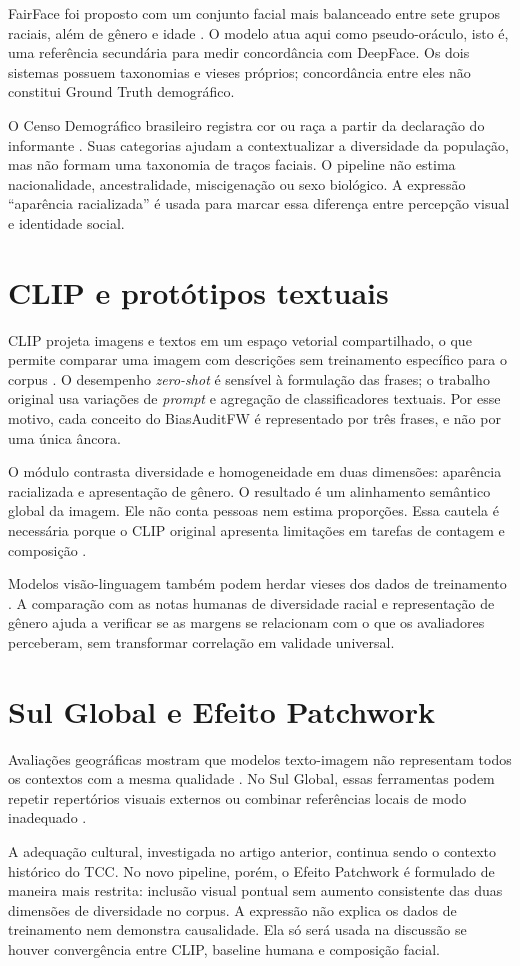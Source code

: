 FairFace foi proposto com um conjunto facial mais balanceado entre sete grupos raciais, além de gênero e idade \cite{karkkainen2021fairface}. O modelo atua aqui como pseudo-oráculo, isto é, uma referência secundária para medir concordância com DeepFace. Os dois sistemas possuem taxonomias e vieses próprios; concordância entre eles não constitui Ground Truth demográfico.

O Censo Demográfico brasileiro registra cor ou raça a partir da declaração do informante \cite{ibge2023corraca}. Suas categorias ajudam a contextualizar a diversidade da população, mas não formam uma taxonomia de traços faciais. O pipeline não estima nacionalidade, ancestralidade, miscigenação ou sexo biológico. A expressão ``aparência racializada'' é usada para marcar essa diferença entre percepção visual e identidade social.

\section{CLIP e protótipos textuais}

CLIP projeta imagens e textos em um espaço vetorial compartilhado, o que permite comparar uma imagem com descrições sem treinamento específico para o corpus \cite{radford2021}. O desempenho \textit{zero-shot} é sensível à formulação das frases; o trabalho original usa variações de \textit{prompt} e agregação de classificadores textuais. Por esse motivo, cada conceito do BiasAuditFW é representado por três frases, e não por uma única âncora.

O módulo contrasta diversidade e homogeneidade em duas dimensões: aparência racializada e apresentação de gênero. O resultado é um alinhamento semântico global da imagem. Ele não conta pessoas nem estima proporções. Essa cautela é necessária porque o CLIP original apresenta limitações em tarefas de contagem e composição \cite{paiss2023counting}.

Modelos visão-linguagem também podem herdar vieses dos dados de treinamento \cite{alsahili2025}. A comparação com as notas humanas de diversidade racial e representação de gênero ajuda a verificar se as margens se relacionam com o que os avaliadores perceberam, sem transformar correlação em validade universal.

\section{Sul Global e Efeito Patchwork}

Avaliações geográficas mostram que modelos texto-imagem não representam todos os contextos com a mesma qualidade \cite{hall2024}. No Sul Global, essas ferramentas podem repetir repertórios visuais externos ou combinar referências locais de modo inadequado \cite{mim2024, rege2025, zhang2024cultural}.

A adequação cultural, investigada no artigo anterior, continua sendo o contexto histórico do TCC. No novo pipeline, porém, o Efeito Patchwork é formulado de maneira mais restrita: inclusão visual pontual sem aumento consistente das duas dimensões de diversidade no corpus. A expressão não explica os dados de treinamento nem demonstra causalidade. Ela só será usada na discussão se houver convergência entre CLIP, baseline humana e composição facial.

